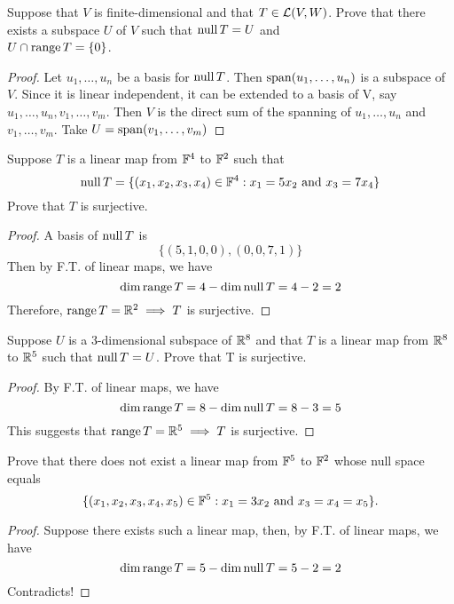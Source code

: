 \begin{exercise}
Suppose that $V$ is finite-dimensional and that \(T \in \mathcal{L}(V,W)\). Prove that there exists a subspace $U$ of $V$ such that \(\mathop{\mathrm{null}} T = U\) and \\ \(U \cap \mathop{\mathrm{range}} T = \{0\}\).
\end{exercise}

\begin{proof}
	Let $u_1, \dots, u_n$ be a basis for $\mathop{\mathrm{null}} T$. Then $\mathop{\mathrm{span}}(u_1, \dots, u_n)$ is a subspace of $V$. Since it is linear independent, it can be extended to a basis of V, say \(u_1, \dots, u_n, v_1, \dots, v_m \). Then $V$ is the direct sum of the spanning of \(u_1, \dots, u_n\) and \(v_1, \dots, v_m\). Take \(U = \mathop{\mathrm{span}}(v_1, \dots, v_m)\)
\end{proof}

\begin{exercise}
Suppose $T$ is a linear map from $\mathbb{F}^4$ to $\mathbb{F}^2$ such that\[
	\mathop{\mathrm{null}} T = \{(x_1, x_2, x_3, x_4) \in \mathbb{F}^4 : x_1 = 5x_2 \text{ and } x_3 = 7 x_4\}\]
Prove that $T$ is surjective.
\end{exercise}

\begin{proof}
	A basis of $\mathop{\mathrm{null}} T$ is \[
		\{(5, 1, 0, 0), (0, 0, 7, 1)\}\]
	Then by F.T. of linear maps, we have \[
		\dim \mathop{\mathrm{range}} T = 4 - \dim \mathop{\mathrm{null}} T = 4 - 2 = 2\]
	Therefore, \(\mathop{\mathrm{range}} T = \mathbb{R}^2 \implies T\) is surjective.
\end{proof}

\begin{exercise}
Suppose $U$ is a 3-dimensional subspace of $\mathbb{R}^8$ and that $T$ is a linear map from $\mathbb{R}^8$ to $\mathbb{R}^5$ such that \(\mathop{\mathrm{null}} T = U \). Prove that T is surjective.
\end{exercise}

\begin{proof}
	By F.T. of linear maps, we have \[
		\dim \mathop{\mathrm{range}} T = 8 - \dim \mathop{\mathrm{null}} T = 8 - 3 = 5\]
	This suggests that \(\mathop{\mathrm{range}} T = \mathbb{R}^5 \implies T\) is surjective.
\end{proof}

\begin{exercise}
Prove that there does not exist a linear map from $\mathbb{F}^5$ to $\mathbb{F}^2$ whose null space equals \[
	\{ (x_1, x_2, x_3, x_4, x_5) \in \mathbb{F}^5 : x_1 = 3 x_2 \text{ and } x_3 = x_4 = x_5\}.\]
\end{exercise}

\begin{proof}
	Suppose there exists such a linear map, then, by F.T. of linear maps, we have \[
		\dim \mathop{\mathrm{range}} T = 5 - \dim \mathop{\mathrm{null}} T = 5 - 2 = 2\]
	Contradicts!
\end{proof}

